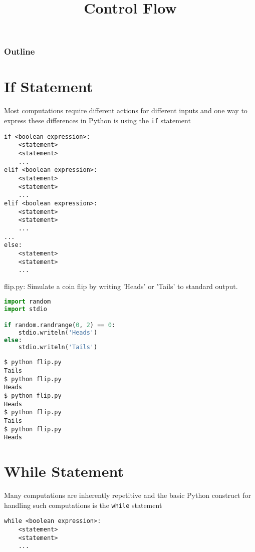 \documentclass[8pt,a4paper,compress]{beamer}
\title{Control Flow}
\date{}
\begin{document}
\begin{frame}
\vfill
\titlepage
\end{frame}

\begin{frame}
\frametitle{Outline}
\tableofcontents
\end{frame}

\section{If Statement}
\begin{frame}[fragile]
Most computations require different actions for different inputs and one way to express these differences in Python is using the \lstinline{if} statement

\smallskip

\begin{lstlisting}[language={}]
if <boolean expression>:
    <statement>
    <statement>
    ...
elif <boolean expression>:
    <statement>
    <statement>
    ...
elif <boolean expression>:
    <statement>
    <statement>
    ...
...
else: 
    <statement>
    <statement>
    ...
\end{lstlisting}
\end{frame}

\begin{frame}[fragile]
\begin{framed}
\tiny flip.py: Simulate a coin flip by writing 'Heads' or 'Tails' to standard output.
\end{framed}

\begin{lstlisting}[language=Python]
import random
import stdio

if random.randrange(0, 2) == 0:
    stdio.writeln('Heads')
else:
    stdio.writeln('Tails')
\end{lstlisting}

\begin{lstlisting}[language={}]
$ python flip.py 
Tails
$ python flip.py 
Heads
$ python flip.py 
Heads
$ python flip.py 
Tails
$ python flip.py 
Heads
\end{lstlisting}
\end{frame}

\section{While Statement}
\begin{frame}[fragile]
Many computations are inherently repetitive and the basic Python construct for handling such computations is the \lstinline{while} statement

\smallskip

\begin{lstlisting}[language={}]
while <boolean expression>:
    <statement>
    <statement>
    ...
\end{lstlisting}
\end{frame}
\end{document}
